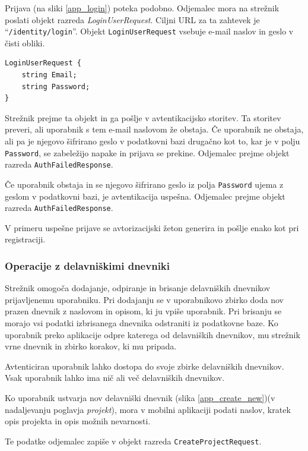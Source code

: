 \documentclass[a4paper, 12pt]{book}
\begin{document}
Prijava (na sliki \ref{app_login}) poteka podobno.
Odjemalec mora na strežnik poslati objekt razreda \textit{LoginUserRequest}.
Ciljni URL za ta zahtevek je \enquote{\texttt{/identity/login}}.
Objekt \texttt{LoginUserRequest} vsebuje e-mail naslov in geslo v čisti obliki.

\begin{verbatim}
LoginUserRequest {
    string Email; 
    string Password; 
} 
\end{verbatim}

Strežnik prejme ta objekt in ga pošlje v avtentikacijsko storitev.
Ta storitev preveri, ali uporabnik s tem e-mail naslovom že obstaja.
Če uporabnik ne obstaja, ali pa je njegovo šifrirano geslo v podatkovni bazi drugačno kot to, kar je v polju \texttt{Password}, se zabeležijo napake in prijava se prekine.
Odjemalec prejme objekt razreda \texttt{AuthFailedResponse}.

Če uporabnik obstaja in se njegovo šifrirano geslo iz polja \texttt{Password} ujema z geslom v podatkovni bazi, je avtentikacija uspešna.
Odjemalec prejme objekt razreda \texttt{AuthFailedResponse}.

V primeru uspešne prijave se avtorizacijski žeton generira in pošlje enako kot pri registraciji.

\subsubsection{Operacije z delavniškimi dnevniki}

Strežnik omogoča dodajanje, odpiranje in brisanje delavniških dnevnikov prijavljenemu uporabniku.
Pri dodajanju se v uporabnikovo zbirko doda nov prazen dnevnik z naslovom in opisom, ki ju vpiše uporabnik.
Pri brisanju se morajo vsi podatki izbrisanega dnevnika odstraniti iz podatkovne baze.
Ko uporabnik preko aplikacije odpre katerega od delavniških dnevnikov, mu strežnik vrne dnevnik in zbirko korakov, ki mu pripada.

Avtenticiran uporabnik lahko dostopa do svoje zbirke delavniških dnevnikov.
Vsak uporabnik lahko ima nič ali več delavniških dnevnikov.


Ko uporabnik ustvarja nov delavniški dnevnik (slika \ref{app_create_new})(v nadaljevanju poglavja \textit{projekt}), mora v mobilni aplikaciji podati naslov, kratek opis projekta in opis možnih nevarnosti.

Te podatke odjemalec zapiše v objekt razreda \texttt{CreateProjectRequest}.
\end{document}
